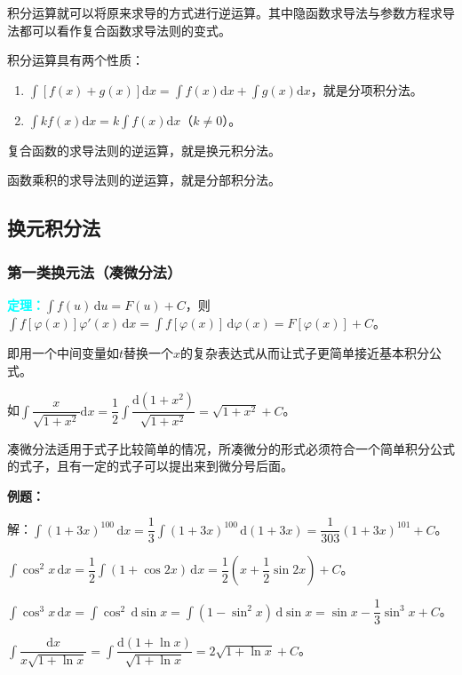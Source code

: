 \documentclass[UTF8, 12pt]{ctexart}
\begin{document}
积分运算就可以将原来求导的方式进行逆运算。其中隐函数求导法与参数方程求导法都可以看作复合函数求导法则的变式。

积分运算具有两个性质：

\begin{enumerate}
    \item $\int[f(x)+g(x)]\textrm{d}x=\int f(x)\textrm{d}x+\int g(x)\textrm{d}x$，就是分项积分法。
    \item $\int kf(x)\textrm{d}x=k\int f(x)\textrm{d}x$（$k\neq 0$）。
\end{enumerate}

复合函数的求导法则的逆运算，就是换元积分法。

函数乘积的求导法则的逆运算，就是分部积分法。

\subsection{换元积分法}

\subsubsection{第一类换元法（凑微分法）}

\textcolor{aqua}{\textbf{定理：}}$\int f(u)\,\textrm{d}u=F(u)+C$，则$\int f[\varphi(x)]\varphi'(x)\,\textrm{d}x=\int f[\varphi(x)]\,\textrm{d}\varphi(x)=F[\varphi(x)]+C$。

即用一个中间变量如$t$替换一个$x$的复杂表达式从而让式子更简单接近基本积分公式。

如$\displaystyle{\int\dfrac{x}{\sqrt{1+x^2}}\textrm{d}x=\dfrac{1}{2}\int\dfrac{\textrm{d}(1+x^2)}{\sqrt{1+x^2}}}=\sqrt{1+x^2}+C$。\medskip

凑微分法适用于式子比较简单的情况，所凑微分的形式必须符合一个简单积分公式的式子，且有一定的式子可以提出来到微分号后面。

\textbf{例题：}

解：$\int(1+3x)^{100}\,\textrm{d}x=\dfrac{1}{3}\int(1+3x)^{100}\,\textrm{d}(1+3x)=\dfrac{1}{303}(1+3x)^{101}+C$。

$\int\cos^2x\,\textrm{d}x=\dfrac{1}{2}\int(1+\cos 2x)\,\textrm{d}x=\dfrac{1}{2}\left(x+\dfrac{1}{2}\sin 2x\right)+C$。

$\int\cos^3x\,\textrm{d}x=\int\cos^2\,\textrm{d}\sin x=\int(1-\sin^2x)\,\textrm{d}\sin x=\sin x-\dfrac{1}{3}\sin^3x+C$。\medskip

$\displaystyle{\int\dfrac{\textrm{d}x}{x\sqrt{1+\ln x}}=\int\dfrac{\textrm{d}(1+\ln x)}{\sqrt{1+\ln x}}}=2\sqrt{1+\ln x}+C$。\medskip
\end{document}
